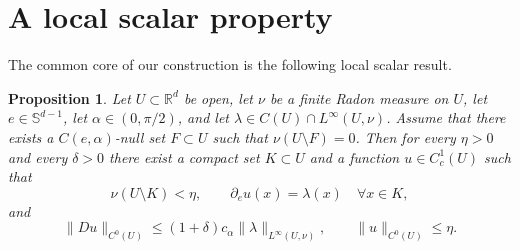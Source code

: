 \documentclass[11pt,a4paper]{article}
\newcommand{\R}{\mathbb{R}}
\newtheorem{prop}[thm]{Proposition}
\theoremstyle{definition}
\theoremstyle{remark}
\begin{document}
\section{A local scalar property}

The common core of our construction is the following local scalar result.


\begin{prop}\label{prop:local}
Let $U\subset\R^d$ be open, let $\nu$ be a finite Radon measure on $U$, let $e\in \mathbb{S}^{d-1}$, let $\alpha\in(0,\pi/2)$,
and let $\lambda\in C(U)\cap L^\infty(U, \nu)$.
Assume that there exists a $C(e,\alpha)$-null set $F\subset U$ such that $\nu(U\setminus F)=0$.
Then for every $\eta>0$ and every $\delta>0$ there exist a compact set $K\subset U$ and a function $u\in C^1_c(U)$ such that
$$
\nu(U\setminus K)<\eta,
\qquad
\partial_e u(x)=\lambda(x)\quad\forall x\in K,
$$
and
$$
\|Du\|_{C^0(U)}\le (1+\delta)c_\alpha \|\lambda\|_{L^\infty(U,\nu)},
\qquad
\|u\|_{C^0(U)}\le \eta.
$$
\end{prop}
\end{document}
